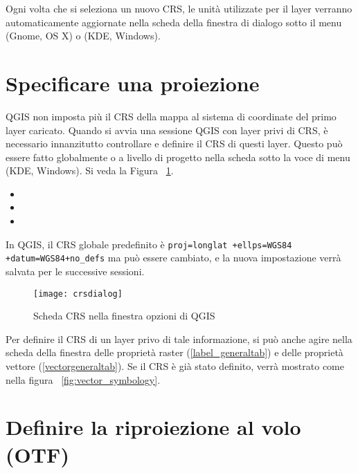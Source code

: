 Ogni volta che si seleziona un nuovo CRS, le unità utilizzate per il layer verranno automaticamente aggiornate 
nella scheda  della finestra di dialogo  
sotto il menu  (Gnome, OS X) o  (KDE, Windows).

\section{Specificare una proiezione}
\label{sec:projection-specifying}

QGIS non imposta più il CRS della mappa al sistema di coordinate del primo 
layer caricato. Quando si avvia una sessione QGIS con layer privi di CRS, 
è necessario innanzitutto controllare e definire il CRS di questi layer. 
Questo può essere fatto globalmente o a livello di progetto nella scheda  
sotto la voce di menu  \arrow {} (KDE, Windows).
Si veda la Figura ~\ref{fig:crsdialog}.

\begin{itemize}[label=--]
\item {}
\item {}
\item {}
\end{itemize}

In QGIS, il CRS globale predefinito è \texttt{proj=longlat +ellps=WGS84 +datum=WGS84+no\_defs}
ma può essere cambiato, e la nuova impostazione verrà salvata per le successive sessioni.

\begin{figure}[ht]
   \centering
   \texttt{[image: crsdialog]}
   \caption{Scheda CRS nella finestra opzioni di QGIS \nixcaption}\label{fig:crsdialog}
\end{figure}

Per definire il CRS di un layer privo di tale informazione, si può anche agire nella scheda 
della finestra delle proprietà raster (\ref{label_generaltab}) e delle proprietà vettore (\ref{vectorgeneraltab}). 
Se il CRS è già stato definito, verrà mostrato come nella figura ~\ref{fig:vector_symbology}.

\section{Definire la riproiezione al volo (OTF)}\label{label_projstart}

